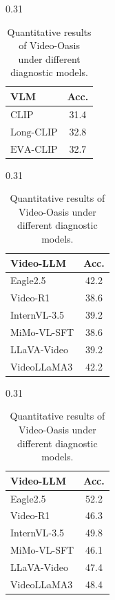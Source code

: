 \begin{table}[h]
        \begin{subtable}[t]{0.31\textwidth}
            \centering
            \begin{tabular}{lc}
                \toprule
                \rowcolor[gray]{0.9} \textbf{VLM} & \textbf{Acc.} \\
                \midrule
                $\text{CLIP}$ & 31.4 \\
                $\text{Long-CLIP}$ & 32.8 \\
                $\text{EVA-CLIP}$ & 32.7 \\
                \bottomrule
            \end{tabular}
            \caption{Bag-of-Frames}
        \end{subtable}
        \hfill
        \begin{subtable}[t]{0.31\textwidth}
            \centering
            \begin{tabular}{lc}
                \toprule
                \rowcolor[gray]{0.9} \textbf{Video-LLM} & \textbf{Acc.} \\
                \midrule
                Eagle2.5 & 42.2 \\
                Video-R1 & 38.6 \\
                InternVL-3.5 & 39.2 \\
                MiMo-VL-SFT & 38.6 \\
                LLaVA-Video & 39.2 \\
                VideoLLaMA3 & 42.2 \\

                \bottomrule
            \end{tabular}
            \caption{Center-Frame}
        \end{subtable}
        \hfill
        \begin{subtable}[t]{0.31\textwidth}
            \centering
            \begin{tabular}{lc}
                \toprule
                \rowcolor[gray]{0.9} \textbf{Video-LLM} & \textbf{Acc.} \\
                \midrule
                Eagle2.5 & 52.2 \\
                Video-R1 & 46.3 \\
                InternVL-3.5 & 49.8 \\
                MiMo-VL-SFT & 46.1 \\
                LLaVA-Video & 47.4 \\
                VideoLLaMA3 & 48.4 \\
                \bottomrule
            \end{tabular}
            \caption{Frame Shuffling}
        \end{subtable}
        \caption{Quantitative results of Video-Oasis under different diagnostic models.} \vspace{-12mm}
        \label{tab:multi_voting_6_tables}
    \end{table}

